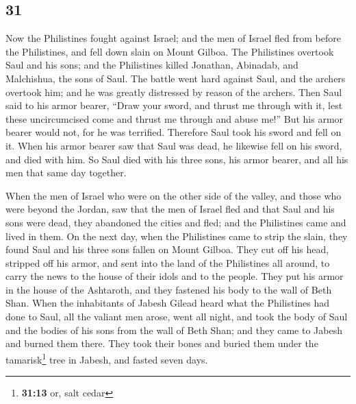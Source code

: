 \begin{paracol}{2}
\begin{otherlanguage}{english}
\hypertarget{section-61}{%
\section{31}\label{section-61}}

 Now the Philistines fought against Israel; and the men of
Israel fled from before the Philistines, and fell down slain on Mount
Gilboa.  The Philistines overtook Saul and his sons; and
the Philistines killed Jonathan, Abinadab, and Malchishua, the sons of
Saul.  The battle went hard against Saul, and the archers
overtook him; and he was greatly distressed by reason of the archers.
 Then Saul said to his armor bearer, ``Draw your sword,
and thrust me through with it, lest these uncircumcised come and thrust
me through and abuse me!'' But his armor bearer would not, for he was
terrified. Therefore Saul took his sword and fell on it. 
When his armor bearer saw that Saul was dead, he likewise fell on his
sword, and died with him.  So Saul died with his three
sons, his armor bearer, and all his men that same day together.

 When the men of Israel who were on the other side of the
valley, and those who were beyond the Jordan, saw that the men of Israel
fled and that Saul and his sons were dead, they abandoned the cities and
fled; and the Philistines came and lived in them.  On the
next day, when the Philistines came to strip the slain, they found Saul
and his three sons fallen on Mount Gilboa.  They cut off
his head, stripped off his armor, and sent into the land of the
Philistines all around, to carry the news to the house of their idols
and to the people.  They put his armor in the house of
the Ashtaroth, and they fastened his body to the wall of Beth Shan.
 When the inhabitants of Jabesh Gilead heard what the
Philistines had done to Saul,  all the valiant men arose,
went all night, and took the body of Saul and the bodies of his sons
from the wall of Beth Shan; and they came to Jabesh and burned them
there.  They took their bones and buried them under the
tamarisk\footnote{\textbf{31:13} or, salt cedar} tree in Jabesh, and
fasted seven days. \end{otherlanguage}
\end{paracol}
